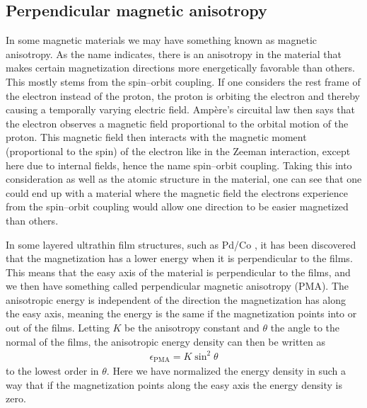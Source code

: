 \subsection{Perpendicular magnetic anisotropy} \label{sec:PMA}
In some magnetic materials we may have something known as magnetic anisotropy. As the name indicates, there is an anisotropy in the material that makes certain magnetization directions more energetically favorable than others. This mostly stems from the spin--orbit coupling. If one considers the rest frame of the electron instead of the proton, the proton is orbiting the electron and thereby causing a temporally varying electric field. Amp\`{e}re's circuital law then says that the electron observes a magnetic field proportional to the orbital motion of the proton. This magnetic field then interacts with the magnetic moment (proportional to the spin) of the electron like in the Zeeman interaction, except here due to internal fields, hence the name spin--orbit coupling. Taking this into consideration as well as the atomic structure in the material, one can see that one could end up with a material where the magnetic field the electrons experience from the spin--orbit coupling would allow one direction to be easier magnetized than others.

In some layered ultrathin film structures, such as Pd/Co \cite{Carcia1985}, it has been discovered that the magnetization has a lower energy when it is perpendicular to the films. This means that the easy axis of the material is perpendicular to the films, and we then have something called perpendicular magnetic anisotropy (PMA). The anisotropic energy is independent of the direction the magnetization has along the easy axis, meaning the energy is the same if the magnetization points into or out of the films. Letting $K$ be the anisotropy constant and $\theta$ the angle to the normal of the films, the anisotropic energy density can then be written as
\begin{align}
\epsilon_{\text{PMA}} = K\sin^2\theta \label{eq:PMADensity}
\end{align} 
to the lowest order in $\theta$. Here we have normalized the energy density in such a way that if the magnetization points along the easy axis the energy density is zero.

